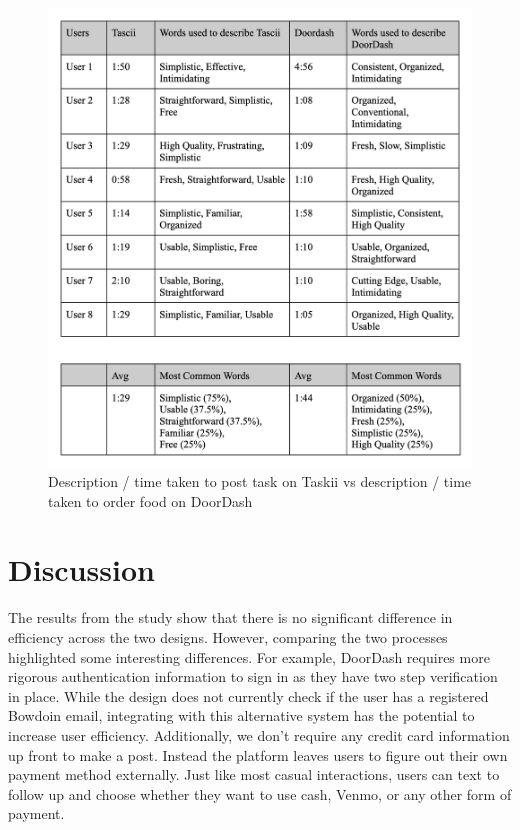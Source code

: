 \begin{figure}[ht]
        \centering
        \caption{Description / time taken to post task on Taskii vs description / time taken to order food on DoorDash}
        \includegraphics[width=1\textwidth]{images/Table.png}
        
        \label{fig:Data Table}
    \end{figure}


\section{Discussion}

The results from the study show that there is no significant difference in efficiency across the two designs. However, comparing the two processes highlighted some interesting differences. For example, DoorDash requires more rigorous authentication information to sign in as they have two step verification in place. While the design does not currently check if the user has a registered Bowdoin email, integrating with this alternative system has the potential to increase user efficiency. Additionally, we don't require any credit card information up front to make a post. Instead the platform leaves users to figure out their own payment method externally. Just like most casual interactions, users can text to follow up and choose whether they want to use cash, Venmo, or any other form of payment. 

